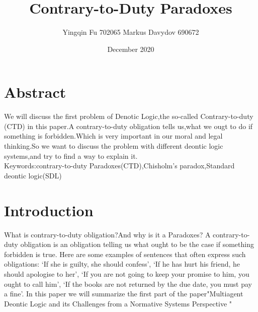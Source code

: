 \documentclass{article}
\title{Contrary-to-Duty Paradoxes}
\author{Yingqin Fu 702065 Markus Davydov 690672 }
\date{December 2020}
\begin{document}
\maketitle
\tableofcontents
\section*{Abstract}
We will discuss the first problem of Denotic Logic,the so-called Contrary-to-duty (CTD) in this paper.A contrary-to-duty obligation tells us,what we ougt to do if something is forbidden.Which is very important in our moral and legal thinking.So we want to discuss the problem with different deontic logic systems,and try to find a way to explain it.\\
Keywords:contrary-to-duty Paradoxes(CTD),Chisholm’s paradox,Standard deontic logic(SDL)
\section*{Introduction}
What is contrary-to-duty obligation?And why is it a Paradoxes? A contrary-to-duty obligation is an obligation telling us what ought to be the case if something forbidden is true. Here are some examples of sentences that often express such obligations: ‘If she is guilty, she should confess’, ‘If he has hurt his friend, he should apologise to her’, ‘If you are not going to keep your promise to him, you ought to call him’, ‘If the books are not returned by the due date, you must pay a fine’. In this paper we will summarize the first part of the paper"Multiagent Deontic Logic and its Challenges from a Normative Systems Perspective "\cite{1} 
\end{document}
